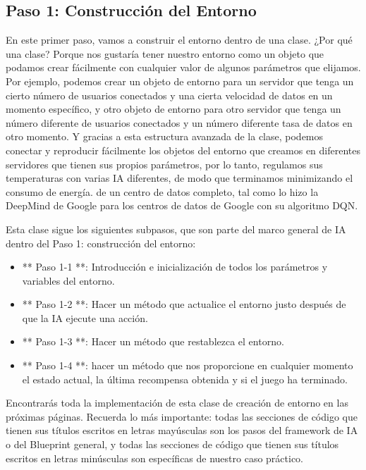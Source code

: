 \documentclass[]{book}
\providecommand{\tightlist}{%
  \setlength{\itemsep}{0pt}\setlength{\parskip}{0pt}}
\begin{document}
\hypertarget{paso-1-construcciuxf3n-del-entorno}{%
\subsection{Paso 1: Construcción del Entorno}\label{paso-1-construcciuxf3n-del-entorno}}

En este primer paso, vamos a construir el entorno dentro de una clase. ¿Por qué una clase? Porque nos gustaría tener nuestro entorno como un objeto que podamos crear fácilmente con cualquier valor de algunos parámetros que elijamos. Por ejemplo, podemos crear un objeto de entorno para un servidor que tenga un cierto número de usuarios conectados y una cierta velocidad de datos en un momento específico, y otro objeto de entorno para otro servidor que tenga un número diferente de usuarios conectados y un número diferente tasa de datos en otro momento. Y gracias a esta estructura avanzada de la clase, podemos conectar y reproducir fácilmente los objetos del entorno que creamos en diferentes servidores que tienen sus propios parámetros, por lo tanto, regulamos sus temperaturas con varias IA diferentes, de modo que terminamos minimizando el consumo de energía. de un centro de datos completo, tal como lo hizo la DeepMind de Google para los centros de datos de Google con su algoritmo DQN.

Esta clase sigue los siguientes subpasos, que son parte del marco general de IA dentro del Paso 1: construcción del entorno:

\begin{itemize}
\tightlist
\item
  ** Paso 1-1 **: Introducción e inicialización de todos los parámetros y variables del entorno.
\item
  ** Paso 1-2 **: Hacer un método que actualice el entorno justo después de que la IA ejecute una acción.
\item
  ** Paso 1-3 **: Hacer un método que restablezca el entorno.
\item
  ** Paso 1-4 **: hacer un método que nos proporcione en cualquier momento el estado actual, la última recompensa obtenida y si el juego ha terminado.
\end{itemize}

Encontrarás toda la implementación de esta clase de creación de entorno en las próximas páginas. Recuerda lo más importante: todas las secciones de código que tienen sus títulos escritos en letras mayúsculas son los pasos del framework de IA o del Blueprint general, y todas las secciones de código que tienen sus títulos escritos en letras minúsculas son específicas de nuestro caso práctico.
\end{document}
